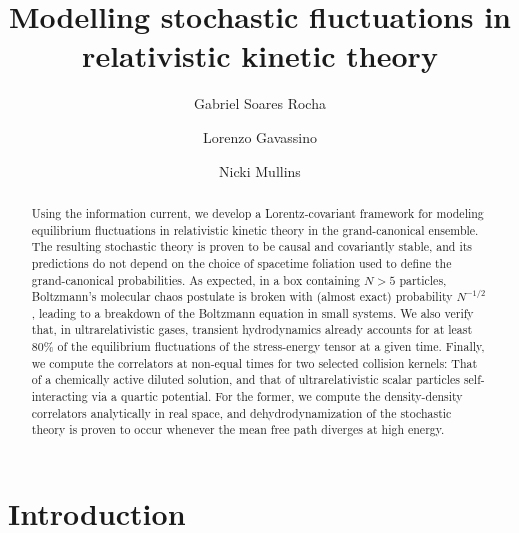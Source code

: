 \documentclass[aps,prd,preprint,nofootinbib,amsmath,amssymb,showpacs,longbibliography,singlecolumn,superscriptaddress,10pt]{revtex4-1}
\theoremstyle{plain}
\theoremstyle{definition}
\begin{document}
\title{Modelling stochastic fluctuations in relativistic kinetic theory}

\author{Gabriel Soares Rocha}


\author{Lorenzo Gavassino}

\author{Nicki Mullins}




\begin{abstract}
Using the information current, we develop a Lorentz-covariant framework for modeling equilibrium fluctuations in relativistic kinetic theory in the grand-canonical ensemble. The resulting stochastic theory is proven to be causal and covariantly stable, and its predictions do not depend on the choice of spacetime foliation used to define the grand-canonical probabilities. As expected, in a box containing $N{>}5$ particles, Boltzmann's molecular chaos postulate is broken with (almost exact) probability $N^{-1/2}$, leading to a breakdown of the Boltzmann equation in small systems. We also verify that, in ultrarelativistic gases, transient hydrodynamics already accounts for at least 80\% of the equilibrium fluctuations of the stress-energy tensor at a given time. Finally, we compute the correlators at non-equal times for two selected collision kernels: That of a chemically active diluted solution, and that of ultrarelativistic scalar particles self-interacting via a quartic potential. For the former, we compute the density-density correlators analytically in real space, and dehydrodynamization of the stochastic theory is proven to occur whenever the mean free path diverges at high energy.
\end{abstract}   



\maketitle


\tableofcontents

\section{Introduction}
\end{document}
